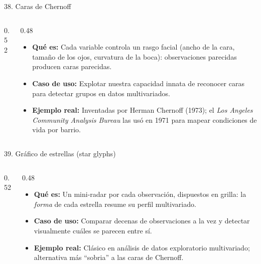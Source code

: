 \documentclass[aspectratio=169,9pt]{beamer}
\newcommand{\ficha}[3]{%
\begin{itemize}
\item \textbf{Qué es:} #1
\item \textbf{Caso de uso:} #2
\item \textbf{Ejemplo real:} #3
\end{itemize}}
\begin{document}
\begin{frame}{38. Caras de Chernoff}
\begin{columns}[T]
\begin{column}{0.52\textwidth}
\centering
{}
\end{column}
\begin{column}{0.48\textwidth}
\ficha{Cada variable controla un rasgo facial (ancho de la cara, tamaño de los ojos, curvatura de la boca): observaciones parecidas producen caras parecidas.}
{Explotar nuestra capacidad innata de reconocer caras para detectar grupos en datos multivariados.}
{Inventadas por Herman Chernoff (1973); el \emph{Los Angeles Community Analysis Bureau} las usó en 1971 para mapear condiciones de vida por barrio.}
\end{column}
\end{columns}
\end{frame}

\begin{frame}{39. Gráfico de estrellas (star glyphs)}
\begin{columns}[T]
\begin{column}{0.52\textwidth}
\centering
{}
\end{column}
\begin{column}{0.48\textwidth}
\ficha{Un mini-radar por cada observación, dispuestos en grilla: la \emph{forma} de cada estrella resume su perfil multivariado.}
{Comparar decenas de observaciones a la vez y detectar visualmente cuáles se parecen entre sí.}
{Clásico en análisis de datos exploratorio multivariado; alternativa más ``sobria'' a las caras de Chernoff.}
\end{column}
\end{columns}
\end{frame}
\end{document}
